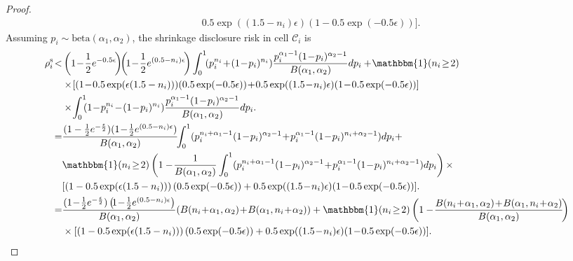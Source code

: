\documentclass[10pt,journal,compsoc]{IEEEtran}
\newcommand{\C}{\mathcal{C}}
\begin{document}
\begin{proof}
\begin{align*}
&0.5\exp((1.5\!-\!n_i)\epsilon)(1\!-\!0.5\exp(-0.5\epsilon))].
\end{align*}
Assuming $p_i\sim\mbox{beta}(\alpha_1,\alpha_2)$, the shrinkage disclosure risk in cell $\C_i$ is
\begin{align*}
\rho^{\text{s}}_i\!<&\left(1\!-\!\frac{1}{2}e^{-0.5\epsilon}\!\right)\!\!\left(\!1\!-\!\frac{1}{2}e^{(0.5-n_i)\epsilon}\!\right)\int_0^1\!(p_i^{n_i}\!+\!(1\!-\!p_i)^{n_i})\frac{p_i^{\alpha_1-1}(1\!-\!p_i)^{\alpha_2-1}}{B(\alpha_1,\alpha_2)}dp_i+\!\mathbbm{1}(n_i\!\ge\!2)\\
&\times\![(1\!-\!0.5\exp(\epsilon(1.5-n_i)))(0.5\exp(-0.5\epsilon))\!+\!0.5\exp((1.5\!-\!n_i)\epsilon)(1\!-\!0.5\exp(-0.5\epsilon))]\\
&\times\!\int_0^1\!\!\!\left(1\!-\!p_i^{n_i}\!-\!(1\!-\!p_i)^{n_i}\right)\!\frac{p_i^{\alpha_1-1}(1\!-\!p_i)^{\alpha_2-1}}{B(\alpha_1,\alpha_2)}dp_i.\\
=&\frac{(1-\frac{1}{2}e^{-\frac{\epsilon}{2}})(1\!-\!\frac{1}{2}e^{(0.5-n_i)\epsilon})}{B(\alpha_1,\alpha_2)}\!\!\int_{0}^{1}(p_i^{n_i+\alpha_1-1}(1\!-\!p_i)^{\alpha_2-1}\!+\!p_i^{\alpha_1-1}(1\!-\!p_i)^{n_i+\alpha_2-1})dp_i+\\
&\mathbbm{1}(n_i\!\ge\!2)\left(1-\!\frac{1}{B(\alpha_1,\alpha_2)}\int_{0}^{1}(p_i^{n_i+\alpha_1-1}(1\!-\!p_i)^{\alpha_2-1}\!+\!p_i^{\alpha_1-1}(1\!-\!p_i)^{n_i+\alpha_2-1})dp_i\right)\times\\
&[\left(1-0.5\exp(\epsilon(1.5-n_i))\right)\left(0.5\exp(-0.5\epsilon)\right)+0.5\exp((1.5\!-\!n_i)\epsilon)(1\!-\!0.5\exp(-0.5\epsilon))].\\
=&\frac{(1\!-\!\frac{1}{2}e^{-\frac{\epsilon}{2}})\left(\!1\!-\!\frac{1}{2}e^{(0.5-n_i)\epsilon}\right)}{B(\alpha_1,\alpha_2)}(B(n_i\!+\!\alpha_1,\alpha_2)\!+\!B(\alpha_1,n_i\!+\!\alpha_2))+\mathbbm{1}(n_i\!\ge\!2)\left(1-\!\frac{B(n_i\!+\!\alpha_1,\alpha_2)\!+\!B(\alpha_1,n_i\!+\!\alpha_2)}{B(\alpha_1,\alpha_2)}\!\right)\\
&\times[\left(1-0.5\exp(\epsilon(1.5-n_i))\right)\left(0.5\exp(-0.5\epsilon)\right)+0.5\exp((1.5\!-\!n_i)\epsilon)(1\!-\!0.5\exp(-0.5\epsilon))].
\end{align*}


\end{proof}
\end{document}

